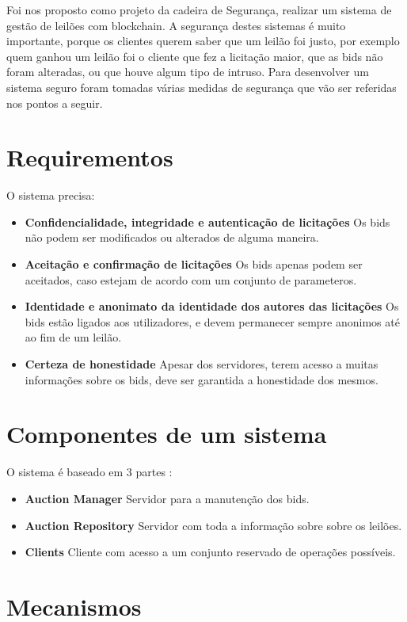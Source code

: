 \documentclass[pdftex,12pt,a4paper]{report}
\begin{document}
Foi nos proposto como projeto da cadeira de Segurança, realizar um sistema de gestão de leilões com blockchain. A segurança destes sistemas é muito importante, porque os clientes querem saber que um leilão foi justo, por exemplo quem ganhou um leilão foi o cliente que fez a licitação maior, que as bids não foram alteradas, ou que houve algum tipo de intruso. Para desenvolver um sistema seguro foram tomadas várias medidas de segurança que vão ser referidas nos pontos a seguir.

\newpage
\section{Requirementos}

O sistema precisa:

\begin{itemize}
\item \textbf{Confidencialidade, integridade e autenticação de licitações} Os bids não podem ser modificados ou alterados de alguma maneira.
\item \textbf{Aceitação e confirmação de licitações} Os bids apenas podem ser aceitados, caso estejam de acordo com um conjunto de parameteros.
\item \textbf{Identidade e anonimato da identidade dos autores das licitações} Os bids estão ligados aos utilizadores, e devem permanecer sempre anonimos até ao fim de um leilão.
\item \textbf{Certeza de honestidade} Apesar dos servidores, terem acesso a muitas informações sobre os bids, deve ser garantida a honestidade dos mesmos.
\end{itemize}

\vskip 2cm
\section{Componentes de um sistema}

O sistema é baseado em 3 partes : 

\begin{itemize}
\item \textbf{Auction Manager} Servidor para a manutenção dos bids.
\item \textbf{Auction Repository} Servidor com toda a informação sobre sobre os leilões.
\item \textbf{Clients} Cliente com acesso a um conjunto reservado de operações possíveis.
\end{itemize}

\newpage
\section{Mecanismos}
\vskip 1cm
\end{document}
